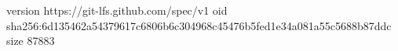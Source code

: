 version https://git-lfs.github.com/spec/v1
oid sha256:6d135462a54379617c6806b6c304968c45476b5fed1e34a081a55c5688b87ddc
size 87883
